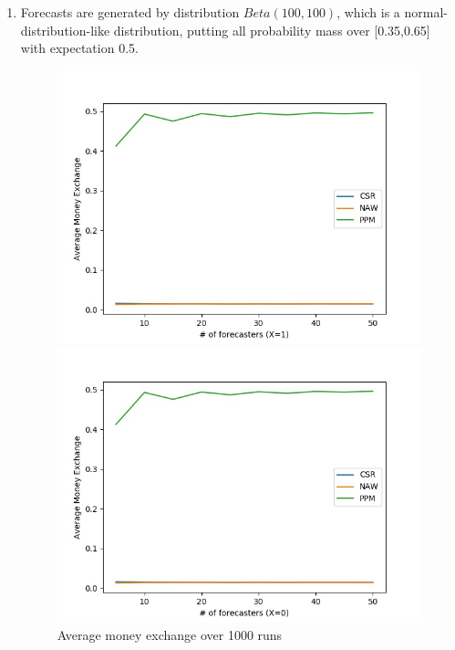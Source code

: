 \documentclass[english,10pt]{article}
\begin{document}
\begin{enumerate}
\begin{enumerate}
	\newpage
	\item Forecasts are generated by distribution $Beta(100, 100)$, which is a normal-distribution-like distribution, putting all probability mass over [0.35,0.65] with expectation 0.5.
		\begin{figure}[H]
        	\centering
        	\begin{minipage}{0.48\textwidth}
        	\includegraphics[width = \textwidth]{(Beta_100_100)Avg_MnEx(X=1).jpg}
        	\end{minipage}
        	\begin{minipage}{0.48\textwidth}
        	\includegraphics[width = \textwidth]{(Beta_100_100)Avg_MnEx(X=0).jpg}
        	\end{minipage}
        	\caption{Average money exchange over 1000 runs}
        	\end{figure}
        	

\end{enumerate}
\end{enumerate}
\end{document}
